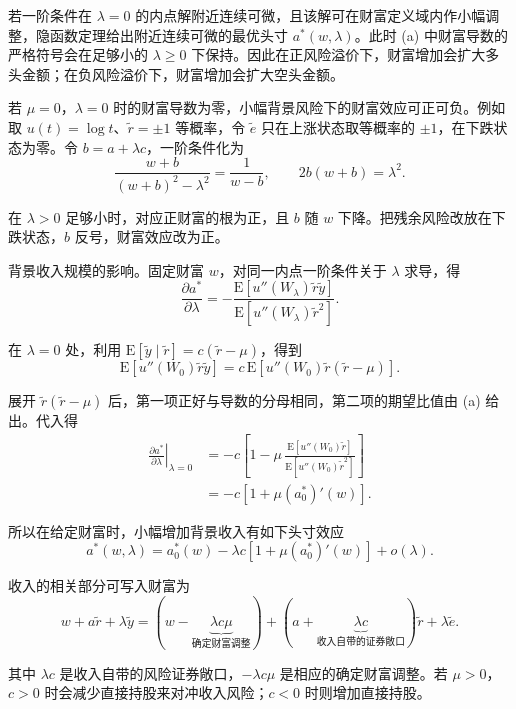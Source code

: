 \begin{solution}[blank-type=manual,blank-vsep=12\baselineskip]
\begin{enumerate}[label=(\alph*)]
若一阶条件在 $\lambda=0$ 的内点解附近连续可微，且该解可在财富定义域内作小幅调整，隐函数定理给出附近连续可微的最优头寸 $a^*(w,\lambda)$。此时 (a) 中财富导数的严格符号会在足够小的 $\lambda\ge0$ 下保持。因此在正风险溢价下，财富增加会扩大多头金额；在负风险溢价下，财富增加会扩大空头金额。

若 $\mu=0$，$\lambda=0$ 时的财富导数为零，小幅背景风险下的财富效应可正可负。例如取 $u(t)=\log t$、$\tilde r=\pm1$ 等概率，令 $\tilde e$ 只在上涨状态取等概率的 $\pm1$，在下跌状态为零。令 $b=a+\lambda c$，一阶条件化为
\[
 \frac{w+b}{(w+b)^2-\lambda^2}=\frac1{w-b},
 \qquad 2b(w+b)=\lambda^2.
\]

在 $\lambda>0$ 足够小时，对应正财富的根为正，且 $b$ 随 $w$ 下降。把残余风险改放在下跌状态，$b$ 反号，财富效应改为正。

背景收入规模的影响。固定财富 $w$，对同一内点一阶条件关于 $\lambda$ 求导，得
\[
 \frac{\partial a^*}{\partial\lambda}
 =-\frac{\mathrm E[u''(W_\lambda)\tilde r\tilde y]}
          {\mathrm E[u''(W_\lambda)\tilde r^2]}.
\]

在 $\lambda=0$ 处，利用 $\mathrm E[\tilde y\mid\tilde r]=c(\tilde r-\mu)$，得到
\[
 \mathrm E[u''(W_0)\tilde r\tilde y]
 =c\,\mathrm E[u''(W_0)\tilde r(\tilde r-\mu)].
\]

展开 $\tilde r(\tilde r-\mu)$ 后，第一项正好与导数的分母相同，第二项的期望比值由 (a) 给出。代入得
\[
 \begin{aligned}
 \left.\frac{\partial a^*}{\partial\lambda}\right|_{\lambda=0}
 &=-c\left[1-\mu\,
 \frac{\mathrm E[u''(W_0)\tilde r]}
      {\mathrm E[u''(W_0)\tilde r^2]}\right]\\
 &=-c[1+\mu(a_0^*)'(w)].
 \end{aligned}
\]

所以在给定财富时，小幅增加背景收入有如下头寸效应
\[
 a^*(w,\lambda)
 =a_0^*(w)-\lambda c[1+\mu(a_0^*)'(w)]+o(\lambda).
\]

收入的相关部分可写入财富为
\[
 w+a\tilde r+\lambda\tilde y=(w-\underbrace{\lambda c\mu}_{\text{确定财富调整}})
 +(a+\underbrace{\lambda c}_{\text{收入自带的证券敞口}})\tilde r
              +\lambda\tilde e.
\]

其中 $\lambda c$ 是收入自带的风险证券敞口，$-\lambda c\mu$ 是相应的确定财富调整。若 $\mu>0$，$c>0$ 时会减少直接持股来对冲收入风险；$c<0$ 时则增加直接持股。

\qedhere
\end{enumerate}
\end{solution}


